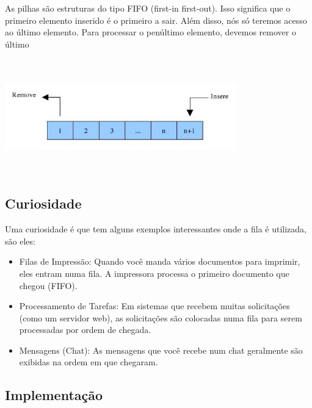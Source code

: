 \documentclass{report}
\begin{document}
	As pilhas são estruturas do tipo FIFO (first-in first-out). Isso significa que o primeiro elemento inserido é o primeiro a sair. Além disso, nós só teremos acesso ao último elemento. Para processar o penúltimo elemento, devemos remover o último
	
			
	
	\begin{center}
		
		\includegraphics[width=10cm,height=5cm,keepaspectratio=false]{imagens/fila.png}
		
	\end{center}
	
	
	\subsection{Curiosidade}
	
	Uma curiosidade é que tem alguns exemplos interessantes onde a fila é utilizada, são eles:
	
	\begin{itemize}
		\item Filas de Impressão: Quando você manda vários documentos para imprimir, eles entram numa fila. A impressora processa o primeiro documento que chegou (FIFO).
		\item Processamento de Tarefas: Em sistemas que recebem muitas solicitações (como um servidor web), as solicitações são colocadas numa fila para serem processadas por ordem de chegada.
		\item Mensagens (Chat): As mensagens que você recebe num chat geralmente são exibidas na ordem em que chegaram.
	\end{itemize}
	
	
	
	\subsection{Implementação}
	
\end{document}
